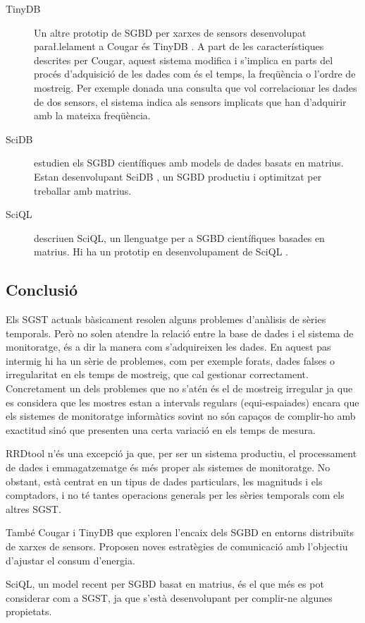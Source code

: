 \begin{description}
\item[TinyDB]
Un altre prototip de SGBD per xarxes de sensors desenvolupat para\l.lelament a Cougar és TinyDB \parencite{tinyDB,madden05}. A part de les característiques descrites per Cougar, aquest sistema  modifica i s'implica en parts del procés d'adquisició de les dades com és el temps, la freqüència o l'ordre de mostreig. Per exemple donada una consulta que vol correlacionar les dades de dos sensors, el sistema indica als sensors implicats que han d'adquirir amb la mateixa freqüència.

\item[SciDB]
\textcite{stonebraker09:scidb} estudien els SGBD científiques amb models  de dades basats en matrius. Estan desenvolupant SciDB \parencite{scidb}, un SGBD productiu i optimitzat per treballar amb matrius.


\item[SciQL]
\textcite{kersten11} descriuen SciQL, un llenguatge per a SGBD científiques basades en matrius. Hi ha un prototip en desenvolupament de SciQL \parencite{sciql}.


\end{description}


\subsection{Conclusió}

Els SGST actuals bàsicament resolen alguns problemes d'anàlisis de sèries temporals.
Però no solen atendre la relació entre la base de dades i el sistema de monitoratge, és a dir la manera com s'adquireixen les dades. En aquest pas intermig hi ha un sèrie de problemes, com per exemple forats, dades falses o irregularitat en els temps de mostreig, que cal gestionar correctament. Concretament un dels problemes que no s'atén és el de mostreig irregular ja que es considera que les mostres estan a intervals regulars (equi-espaiades) encara que els sistemes de monitoratge informàtics sovint no són capaços de complir-ho amb exactitud sinó que presenten una certa variació en els temps de mesura. 

RRDtool n'és una excepció ja que, per ser un sistema productiu, el processament de dades i emmagatzematge és més proper als sistemes de monitoratge. No obstant, està centrat en un tipus de dades particulars, les magnituds i els comptadors, i no té tantes operacions generals per les sèries temporals com els altres SGST.

També Cougar i TinyDB que exploren l'encaix dels SGBD en entorns distribuïts de xarxes de sensors. Proposen noves estratègies de comunicació amb l'objectiu d'ajustar el consum d'energia. 


SciQL, un model recent per SGBD  basat en matrius, és el que més es pot considerar com a SGST, ja que s'està desenvolupant per complir-ne algunes propietats.




